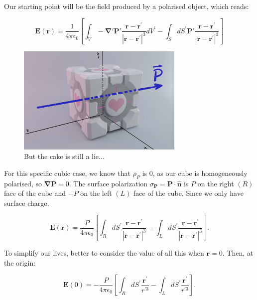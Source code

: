 Our starting point will be the field produced by a polarised object, which reads:

\begin{equation}
	\mathbf{E}(\mathbf{r})=\frac{1}{4 \pi \epsilon_{0}}\left[\int_{V}  - \mathbf{\nabla}' \mathbf{P}' \frac{\mathbf{r}-\mathbf{r}^{\prime}}{\left|\mathbf{r}-\mathbf{r}^{\prime}\right|^{3}} d V^{\prime} -\int_{S} d S^{\prime} \mathbf{P}' \frac{\mathbf{r}-\mathbf{r}^{\prime}}{\left|\mathbf{r}-\mathbf{r}^{\prime}\right|^{3}}\right]
\end{equation}

\begin{figure}[h!]
	\includegraphics[width=8cm]{figures/Gladys.png}
	\centering
	\caption{But the cake is still a lie...}
\end{figure}

For this specific cubic case, we know that $\rho_{P}$ is 0, as our cube is homogeneously polarised, so $\mathbf{\nabla P} = 0$. The surface polarization $\sigma_{\mathbf{P}}=\mathbf{P} \cdot \hat{\mathbf{n}}$ is $P$ on the right $(R)$ face of the cube and $-P$ on the left $(L)$ face of the cube. Since we only have surface charge,

\begin{equation}
	\mathbf{E}(\mathbf{r})=\frac{P}{4 \pi \epsilon_{0}}\left[\int_{R} d S^{\prime} \frac{\mathbf{r}-\mathbf{r}^{\prime}}{\left|\mathbf{r}-\mathbf{r}^{\prime}\right|^{3}}-\int_{L} d S^{\prime} \frac{\mathbf{r}-\mathbf{r}^{\prime}}{\left|\mathbf{r}-\mathbf{r}^{\prime}\right|^{3}}\right].
\end{equation}

To simplify our lives, better to consider the value of all this when $\mathbf{r}=0$. Then, at the origin:

\begin{equation}
	\mathbf{E}(0)=-\frac{P}{4 \pi \epsilon_{0}}\left[\int_{R} d S^{\prime} \frac{\mathbf{r}^{\prime}}{r^{\prime 3}}-\int_{L} d S^{\prime} \frac{\mathbf{r}^{\prime}}{r^{\prime 3}}\right].
\end{equation}


